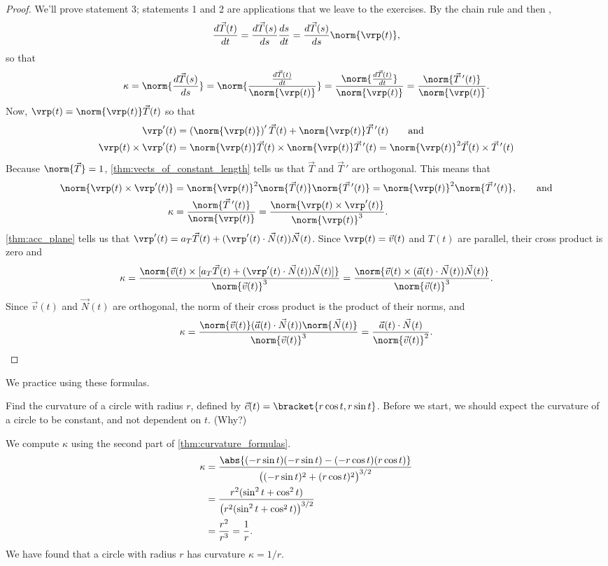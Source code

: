 \begin{proof}
We'll prove statement 3; statements 1 and 2 are applications that we leave to the exercises.  By the chain rule and then ,
\[
\frac{d\vec T(t)}{dt}
=\frac{d\vec T(s)}{ds}\frac{ds}{dt}
=\frac{d\vec T(s)}{ds}\norm{\vrp(t)},
\]
so that
\[
\kappa=\norm{\frac{d\vec T(s)}{ds}}
=\norm{\frac{\frac{d\vec T(t)}{dt}}{\norm{\vrp(t)}}}
=\frac{\norm{\frac{d\vec T(t)}{dt}}}{\norm{\vrp(t)}}
=\frac{\norm{\vec T\,'(t)}}{\norm{\vrp(t)}}.
\]
Now, $\vrp(t)=\norm{\vrp(t)}\vec T(t)$ so that
\begin{align*}
 \vrp'(t)&=\left(\norm{\vrp(t)}\right)'\vec T(t)+\norm{\vrp(t)}\vec T\,'(t)
 \qquad\text{and}\\
 \vrp(t)\times\vrp'(t)
 &=\norm{\vrp(t)}\vec T(t)\times\norm{\vrp(t)}\vec T\,'(t)
 =\norm{\vrp(t)}^2\vec T(t)\times\vec T\,'(t)
\end{align*}
Because $\norm{\vec T}=1$, \autoref{thm:vects_of_constant_length} tells us that $\vec T$ and $\vec T\,'$ are orthogonal.  This means that
\begin{align*}
 \norm{\vrp(t)\times\vrp'(t)}
 &=\norm{\vrp(t)}^2\norm{\vec T(t)}\norm{\vec T\,'(t)}
 =\norm{\vrp(t)}^2\norm{\vec T\,'(t)},\qquad\text{and}\\
 \kappa
 &=\frac{\norm{\vec T\,'(t)}}{\norm{\vrp(t)}}
 =\frac{\norm{\vrp(t)\times\vrp'(t)}}{\norm{\vrp(t)}^3}.
\end{align*}
\autoref{thm:acc_plane} tells us that $\vrp'(t)=a_T\vec T(t)+(\vrp'(t)\cdot\vec N(t))\vec N(t)$.  Since $\vrp(t)=\vec v(t)$ and $T(t)$ are parallel, their cross product is zero and
\[
 \kappa
 =\frac{\norm{\vec v(t)\times[a_T\vec T(t)+(\vrp'(t)\cdot\vec N(t))\vec N(t)]}}
 {\norm{\vec v(t)}^3}
 =\frac{\norm{\vec v(t)\times(\vec a(t)\cdot\vec N(t))\vec N(t)}}{\norm{\vec v(t)}^3}.
\]
Since $\vec v(t)$ and $\vec N(t)$ are orthogonal, the norm of their cross product is the product of their norms, and
\[
\kappa
=\frac{\norm{\vec v(t)}(\vec a(t)\cdot\vec N(t))\norm{\vec N(t)}}{\norm{\vec v(t)}^3}
=\frac{\vec a(t)\cdot\vec N(t)}{\norm{\vec v(t)}^2}.\qedhere
\]
\end{proof}

We practice using these formulas.

\begin{example}\label{ex_curvature2}
Find the curvature of a circle with radius $r$, defined by $\vec c(t) =\bracket{r\cos t,r\sin t}$.
\solution
Before we start, we should expect the curvature of a circle to be constant, and not dependent on $t$. (Why?)

We compute $\kappa$ using the second part of \autoref{thm:curvature_formulas}.
\begin{align*}
	\kappa
	&= \frac{\abs{(-r\sin t)(-r\sin t) - (-r\cos t)(r\cos t)}}{\bigl( (-r\sin t)^2+(r\cos t)^2\bigr)^{3/2}} \smallskip\\
	&= \frac{r^2(\sin^2t+\cos^2t)}{\bigl(r^2(\sin^2t+\cos^2t)\bigr)^{3/2}}\smallskip\\
	&= \frac{r^2}{r^3} = \frac1r.
\end{align*}
We have found that a circle with radius $r$ has curvature $\kappa = 1/r$.
\end{example}

